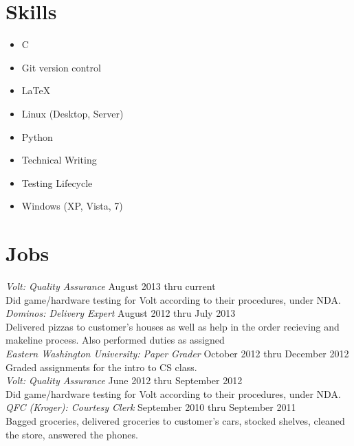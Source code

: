 \documentclass[line, margin]{res}
\begin{document}
\begin{resume}
\section{Skills}
\begin{multicols}{2}
  \begin{itemize}
    \item C
    \item Git version control
    \item \LaTeX
    \item Linux (Desktop, Server)
    \item Python
    \item Technical Writing
    \item Testing Lifecycle
    \item Windows (XP, Vista, 7)
  \end{itemize}
\end{multicols}

\section{Jobs}
 \textit{Volt: Quality Assurance} \hfill August 2013 thru current \\
 Did game/hardware testing for Volt according to their procedures, under NDA. \\ [6pt]
 \textit{Dominos: Delivery Expert} \hfill August 2012 thru July 2013 \\
 Delivered pizzas to customer's houses as well as help in the order
 recieving and makeline process. Also performed duties as assigned \\ [6pt]
 \textit{Eastern Washington University: Paper Grader} \hfill October 2012 thru December 2012 \\
 Graded assignments for the intro to CS class. \\ [6pt]
 \textit{Volt: Quality Assurance} \hfill June 2012 thru September 2012 \\
 Did game/hardware testing for Volt according to their procedures, under NDA. \\ [6pt]
 \textit{QFC (Kroger): Courtesy Clerk} \hfill September 2010 thru September 2011 \\
 Bagged groceries, delivered groceries to customer's cars, stocked
 shelves, cleaned the store, answered the phones. \\ 

\end{resume}
\end{document}
